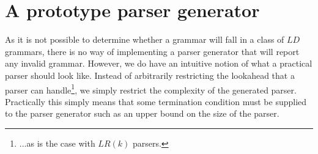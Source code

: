 \documentclass[envcountsame,runningheads]{llncs}
\begin{document}
%
%
%
%



\section{A prototype parser generator}

As it is not possible to determine whether a grammar will fall in a class of $LD$ grammars,
there is no way of implementing a parser generator that will report any invalid grammar.
However, we do have an intuitive notion of what a practical parser should look like.
Instead of arbitrarily restricting the lookahead that a parser can handle\footnote{...as is the case with $LR(k)$ parsers.},
we simply restrict the complexity of the generated parser.
Practically this simply means that some termination condition must be supplied to the parser generator such as an upper bound on the size of the parser.
\end{document}

